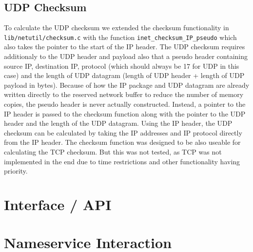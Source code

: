 \subsection{UDP Checksum}

To calculate the UDP checksum we extended the checksum functionality in \verb|lib/netutil/checksum.c| with the function \verb|inet_checksum_IP_pseudo| which also takes the pointer to the start of the IP header. The UDP checksum requires additionaly to the UDP header and payload also that a pseudo header containing source IP, destination IP, protocol (which should always be 17 for UDP in this case) and the length of UDP datagram (length of UDP header + length of UDP payload in bytes).
Because of how the IP package and UDP datagram are already written directly to the reserved network buffer to reduce the number of memory copies, the pseudo header is never actually constructed. Instead, a pointer to the IP header is passed to the checksum function along with the pointer to the UDP header and the length of the UDP datagram. Using the IP header, the UDP checksum can be calculated by taking the IP addresses and IP protocol directly from the IP header.
The checksum function was designed to be also useable for calculating the TCP checksum. But this was not tested, as TCP was not implemented in the end due to time restrictions and other functionality having priority.

\section{Interface / API}

\section{Nameservice Interaction}